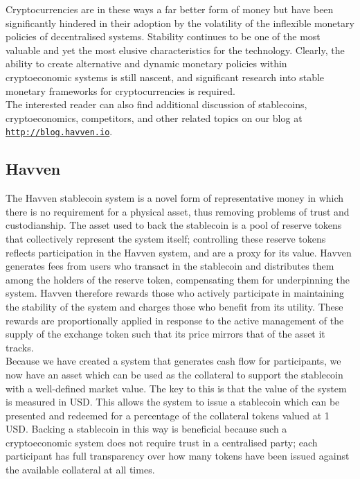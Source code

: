 \noindent Cryptocurrencies are in these ways a far better form of money but have been significantly hindered
in their adoption by the volatility of the inflexible monetary policies of decentralised systems. Stability continues to be one of the most valuable and yet the most elusive
characteristics for the technology. Clearly, the ability to create alternative and dynamic monetary policies within
cryptoeconomic systems is still nascent, and significant research into stable monetary
frameworks for cryptocurrencies is required. \\

\noindent The interested reader can also find additional discussion of stablecoins,
cryptoeconomics, competitors, and other related topics on our blog at \href{http://blog.havven.io}{\texttt{http://blog.havven.io}}.



\subsection{Havven}

\noindent The Havven stablecoin system is a novel form of representative money in which there is no requirement for a physical
asset, thus removing problems of trust and custodianship. The asset used to back the stablecoin is 
a pool of reserve tokens that collectively represent the system itself; controlling these reserve tokens reflects participation in the Havven system,
and are a proxy for its value. Havven generates fees from users who transact in the stablecoin and distributes them among the holders of the reserve token, compensating them for underpinning the system.
Havven therefore rewards those who actively participate in maintaining the stability of the system and charges those who benefit from its utility. These rewards are proportionally applied in response to the active management of the supply of the exchange token such that its price mirrors that of the asset it tracks. \\

\noindent Because we have created a system that generates cash flow for participants, we now have an asset which can be used as the collateral to support the stablecoin with a well-defined market value. The key to this is that the value of the
system is measured in USD. This allows the system to issue a stablecoin which can be presented and redeemed for a
percentage of the collateral tokens valued at 1 USD. Backing a stablecoin in this way is beneficial because
such a cryptoeconomic system does not require trust in a centralised party; each participant has full
transparency over how many tokens have been issued against the available collateral at all times. \\

